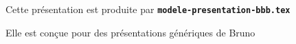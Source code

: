   \item Cette présentation est produite par \texttt{\textbf{modele-presentation-bbb.tex}}
  \item Elle est conçue pour des présentations génériques de Bruno
